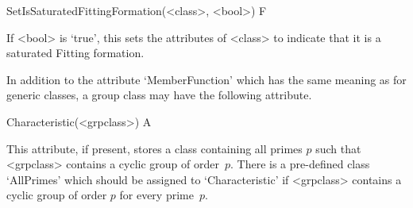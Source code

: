 \>SetIsSaturatedFittingFormation(<class>, <bool>) F

If <bool> is `true', this sets the attributes of <class> to indicate that it
is a saturated Fitting formation.


\null


In addition to the attribute `MemberFunction' which has the same meaning as
for generic classes, a group class may have the following attribute.

\>Characteristic(<grpclass>) A

This attribute, if present, stores a class containing all primes $p$ such
that <grpclass> contains a cyclic group of order~$p$. There is a pre-defined
class `AllPrimes' which should be assigned to `Characteristic' if <grpclass>
contains a cyclic group of order $p$ for every prime~$p$.


